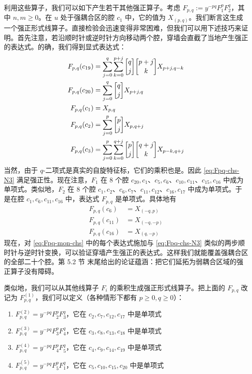 利用这些算子，我们可以如下产生若干其他强正算子。考虑 $F_{p,q}:=y^{-pq}F_1^p F_2^q$，其中 $n,m\geq 0$。在 $u$ 处于强耦合区的腔 $c_1$ 中，它的值为 $X_{(p,q)}$。我们断言这生成一个强正形式线算子。直接检验会迅速变得非常困难，但我们可以用下述技巧来证明。首先注意，若沿顺时针或逆时针方向移动两个腔，穿墙会直截了当地产生强正的表达式。的确，我们得到显式表达式：
\begin{equation}\label{eq:Fpq-chs-N3}
\begin{split}
F_{p,q}(c_{19}) & = \sum_{j=0}^q \sum_{k=0}^{p+j} \qbinom{q}{j}\qbinom{p+j}{k} X_{p+j,q-k} \\
F_{p,q}(c_{20}) & = \sum_{j=0}^q \qbinom{q}{j} X_{p+j,q} \\
F_{p,q}(c_1) & = X_{p,q} \\
F_{p,q}(c_2) & = \sum_{j=0}^p \qbinom{p}{j} X_{p,q+j} \\
F_{p,q}(c_3) & = \sum_{j=0}^p \sum_{k=0}^{q+j} \qbinom{p}{j}\qbinom{q+j}{k} X_{p-k,q+j}
\end{split}
\end{equation}
当然，由于 $q$-二项式是真实的自旋特征标，它们的乘积也是。因此 \eqref{eq:Fpq-chs-N3} 满足强正性。现在注意，$F_1$ 在 $8$ 个腔 $c_{20},c_1$、$c_5,c_6$、$c_{10},c_{11}$、$c_{15},c_{16}$ 中成为单项式。类似地，$F_2$ 在 $8$ 个腔 $c_1,c_2$、$c_6,c_7$、$c_{11},c_{12}$、$c_{16},c_{17}$ 中成为单项式。于是在腔 $c_1,c_6,c_{11},c_{16}$ 中，表达式 $F_{p,q}$ 是单项式。具体地有
\begin{equation}\label{eq:Fpq-mon-chs}
\begin{split}
F_{p,q}(c_6) & = X_{(-q,p)} \\
F_{p,q}(c_{11}) & = X_{(-q,-p)} \\
F_{p,q}(c_{16}) & = X_{(q,-p)}
\end{split}
\end{equation}
现在，对 \eqref{eq:Fpq-mon-chs} 中的每个表达式施加与 \eqref{eq:Fpq-chs-N3} 类似的两步顺时针与逆时针变换，可以验证穿墙产生强正的表达式。这样我们就能覆盖强耦合区的全部二十个腔。第 5.2 节%
末尾给出的论证蕴涵：把它们延拓为弱耦合区域的强正算子没有障碍。

类似地，我们可以从其他线算子 $F_i$ 的乘积生成强正形式线算子。把上面的 $F_{p,q}$ 改记为 $F^{(1)}_{p,q}$，我们可以定义（各种情形下都有 $p\geq 0,q\geq 0$）：

\begin{enumerate}

\item $F^{(2)}_{p,q} = y^{-pq} F_2^p F_3^q$，它在 $c_2,c_7,c_{12},c_{17}$ 中是单项式

\item $F^{(3)}_{p,q} = y^{-pq} F_3^p F_4^q$，它在 $c_3,c_8,c_{13},c_{18}$ 中是单项式

\item $F^{(4)}_{p,q} = y^{-pq} F_4^p F_5^q$，它在 $c_4,c_9,c_{14},c_{19}$ 中是单项式

\item $F^{(5)}_{p,q} = y^{-pq} F_5^p F_1^q$，它在 $c_5,c_{10},c_{15},c_{20}$ 中是单项式

\end{enumerate}

